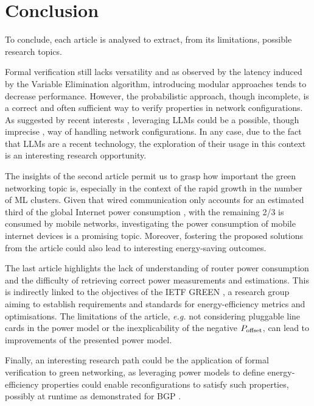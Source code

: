 \documentclass[conference]{IEEEtran} %
\begin{document}







\section{Conclusion}
To conclude, each article is analysed to extract, from its limitations, possible research topics.

Formal verification still lacks versatility and as observed by the latency induced by the Variable Elimination algorithm, introducing modular approaches tends to decrease performance.
However, the probabilistic approach, though incomplete, is a correct and often sufficient way to verify properties in network configurations.
As suggested by recent interests \cite{LeveragingLLM, LLMNetConf}, leveraging LLMs could be a possible, though imprecise \cite{LLMBench}, way of handling network configurations.
In any case, due to the fact that LLMs are a recent technology, the exploration of their usage in this context is an interesting research opportunity.   


The insights of the second article permit us to grasp how important the green networking topic is, especially in the context of the rapid growth in the number of ML clusters.
Given that wired communication only accounts for an estimated third of the global Internet power consumption \cite{NetPerc}, with the remaining 2/3 is consumed by mobile networks, investigating the power consumption of mobile internet devices is a promising topic.  
Moreover, fostering the proposed solutions from the article could also lead to interesting energy-saving outcomes.


The last article highlights the lack of understanding of  router power consumption and the difficulty of retrieving correct power measurements and estimations.
This is indirectly linked to the objectives of the IETF GREEN \cite{IetfGreen}, a research group aiming to establish requirements and standards for energy-efficiency metrics and optimisations.  
The limitations of the article, \textit{e.g.} not considering pluggable line cards in the power model or the inexplicability of the negative $P_\textnormal{offset}$, can lead to improvements of the presented power model.

Finally, an interesting research path could be the application of formal verification to green networking, as leveraging power models to define energy-efficiency properties could enable reconfigurations to satisfy such properties, possibly at runtime as demonstrated for BGP \cite{chameleon}.
\end{document}
